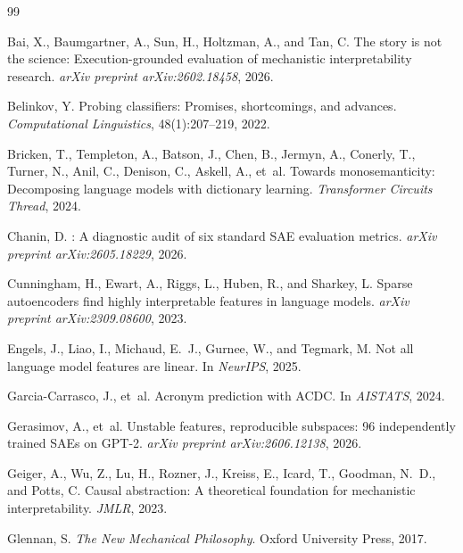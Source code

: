 \documentclass[10pt]{article}
\begin{document}
\begin{thebibliography}{99}

Bai, X., Baumgartner, A., Sun, H., Holtzman, A., and Tan, C.
\newblock The story is not the science: Execution-grounded evaluation of mechanistic interpretability research.
\newblock \emph{arXiv preprint arXiv:2602.18458}, 2026.

Belinkov, Y.
\newblock Probing classifiers: Promises, shortcomings, and advances.
\newblock \emph{Computational Linguistics}, 48(1):207--219, 2022.

Bricken, T., Templeton, A., Batson, J., Chen, B., Jermyn, A., Conerly, T., Turner, N., Anil, C., Denison, C., Askell, A., et~al.
\newblock Towards monosemanticity: Decomposing language models with dictionary learning.
\newblock \emph{Transformer Circuits Thread}, 2024.

Chanin, D.
: A diagnostic audit of six standard {SAE} evaluation metrics.
\newblock \emph{arXiv preprint arXiv:2605.18229}, 2026.

Cunningham, H., Ewart, A., Riggs, L., Huben, R., and Sharkey, L.
\newblock Sparse autoencoders find highly interpretable features in language models.
\newblock \emph{arXiv preprint arXiv:2309.08600}, 2023.

Engels, J., Liao, I., Michaud, E.~J., Gurnee, W., and Tegmark, M.
\newblock Not all language model features are linear.
\newblock In \emph{NeurIPS}, 2025.

Garcia-Carrasco, J., et~al.
\newblock Acronym prediction with ACDC.
\newblock In \emph{AISTATS}, 2024.

Gerasimov, A., et~al.
\newblock Unstable features, reproducible subspaces: 96 independently trained {SAEs} on {GPT}-2.
\newblock \emph{arXiv preprint arXiv:2606.12138}, 2026.

Geiger, A., Wu, Z., Lu, H., Rozner, J., Kreiss, E., Icard, T., Goodman, N.~D., and Potts, C.
\newblock Causal abstraction: A theoretical foundation for mechanistic interpretability.
\newblock \emph{JMLR}, 2023.

Glennan, S.
\newblock \emph{The New Mechanical Philosophy}.
\newblock Oxford University Press, 2017.


\end{thebibliography}
\end{document}
